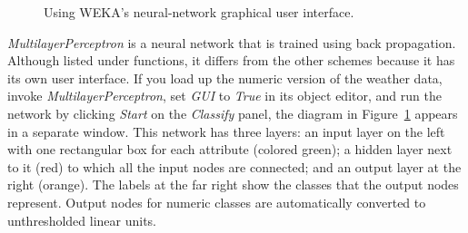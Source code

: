 \begin{figure}[!th]
\centering
{}
\qquad
{}
\caption{\label{fig:mlp_editor}Using WEKA's neural-network graphical user interface.}
\end{figure}

\textit{MultilayerPerceptron} is a neural network that is trained using
back propagation. Although listed under functions, it differs from the
other schemes because it has its own user interface. If you load up
the numeric version of the weather data, invoke
\textit{MultilayerPerceptron}, set \textit{GUI} to \textit{True} in
its object editor, and run the network by clicking \textit{Start} on
the \textit{Classify} panel, the diagram in
Figure~\ref{fig:mlp_editor} appears in a separate window. This network
has three layers: an input layer on the left with one rectangular box
for each attribute (colored green); a hidden layer next to it (red) to
which all the input nodes are connected; and an output layer at the
right (orange). The labels at the far right show the classes that the
output nodes represent. Output nodes for numeric classes are
automatically converted to unthresholded linear units.

